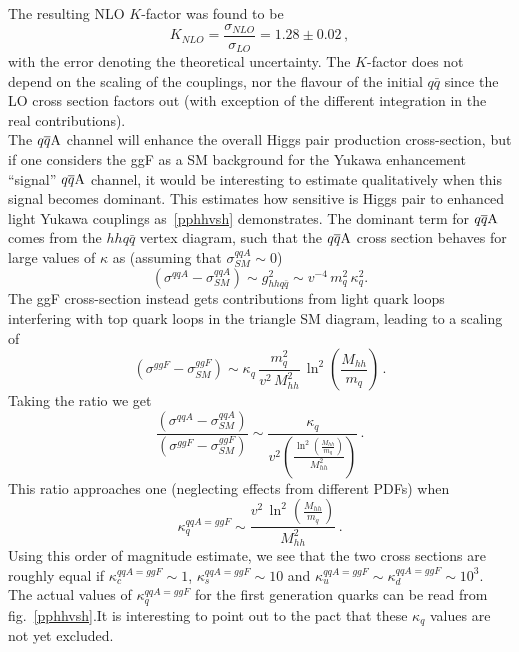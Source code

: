 The resulting NLO $K$-factor was found to be
\begin{equation}
	K_{NLO}=\frac{\sigma_{NLO}}{\sigma_{LO}} = 1.28 \pm 0.02\,,
\end{equation}
with the error denoting the theoretical uncertainty.
The $K$-factor does not depend on the scaling of the couplings, nor the flavour of the initial $q \bar q$ since the LO cross section factors out (with exception of the different integration in the real contributions). \\
The $q\overline q \rm A$ channel will enhance the overall Higgs pair production cross-section, but if one considers the ggF as a SM background for the Yukawa enhancement  ``signal'' $q\overline q \rm A$ channel, it would be interesting to estimate qualitatively when this signal becomes dominant. This estimates how sensitive is Higgs pair to enhanced light Yukawa couplings as~\autoref{pphhvsh} demonstrates.
The dominant term for  $q\overline q \rm A$ comes from the $hh q \bar q$ vertex diagram, such that the $q\overline q \rm A$ cross section behaves for large values of $\kappa$ as (assuming that $ \sigma^{qqA}_{SM}\sim 0 $)
\begin{equation}
	(\sigma^{qqA}-\sigma^{qqA}_{SM}) \sim  g_{hh q \bar q}^2 \sim v^{-4}\,{m_q^2\,\kappa_q^2}.
\end{equation}
The ggF cross-section instead gets contributions from light quark loops interfering with top quark loops in the triangle SM diagram,  leading to a scaling of
\begin{equation}
	(\sigma^{ggF} - \sigma^{ggF}_{SM} ) \sim  \kappa_q\, \frac{m_q^2}{ v^2\,M_{hh}^2}\,\ln^2{\left(\frac{M_{hh}}{m_q}\right)}\,.
\end{equation}
Taking the ratio we get
\begin{equation}
	\frac{(\sigma^{qqA}-\sigma^{qqA}_{SM})}{(\sigma^{ggF} - \sigma^{ggF}_{SM} )} \sim  \frac{\kappa_q}{ v^2\left(\frac{
			\ln^2{\left(\frac{M_{hh}}{m_q}\right)}}{M_{hh}^2}\right)}\,.
\end{equation}
This ratio approaches one (neglecting effects from different PDFs) when
\begin{equation}
	\kappa_q^{qqA = ggF} \sim  \frac{v^2\,\ln^2{\left(\frac{M_{hh}}{m_q}\right)}}{M_{hh}^2}\,.
\end{equation}
Using this order of magnitude estimate, we see that  the two cross sections are roughly equal if $\kappa_c^{qqA = ggF} \sim 1$, $\kappa_s^{qqA = ggF} \sim 10$ and $\kappa_u^{qqA = ggF} \sim \kappa_d^{qqA = ggF} \sim 10^3$.
The actual values of $\kappa_q^{qqA = ggF}$ for the first generation quarks can be read from fig.~\ref{pphhvsh}.It is interesting to point out to the pact that these $\kappa_q$ values are not yet excluded.
